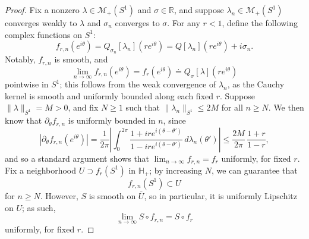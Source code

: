 \documentclass{cams-l} %
\newcommand{\dave}[1]{#1}\newcommand{\davebegin}{}\newcommand{\daveend}{}\newcommand{\george}[1]{#1}
\newcommand{\RR}{\mathbb R}
\newcommand{\HH}{\mathbb H}
\newcommand{\cM}{\mathcal M}
\newcommand{\ovl}[1]{{\overline{#1}}}
\theoremstyle{definition}
\theoremstyle{remark}
\numberwithin{equation}{section}
\begin{document}
\begin{proof}
    Fix a nonzero $\lambda\in\cM_+(S^1)$ and $\sigma\in\RR$, and suppose $\lambda_n\in\cM_+(S^1)$ converges weakly to $\lambda$ and $\sigma_n$ converges to $\sigma$. For any $r<1$, define the following complex functions on $S^1$:
    \[f_{r,n}(e^{i\theta}) = Q_{\sigma_n}[\lambda_n](re^{i\theta}) = Q[\lambda_n](re^{i\theta}) + i\sigma_n.\]
    Notably, $f_{r,n}$ is smooth, and 
    \[\lim_{n\to\infty} f_{r,n}(e^{i\theta}) = f_r(e^{i\theta})\doteq Q_\sigma[\lambda](re^{i\theta})\]
    pointwise in $S^1$; this follows from the weak convergence of $\lambda_n$, as the Cauchy kernel is smooth and uniformly bounded along each fixed $r$. Suppose $\|\lambda\|_{S^1} = M>0$, and fix $N\geq 1$ such that $\|\lambda_{n}\|_{S^1}\leq 2M$ for all $n\geq N$. We then know that $\partial_\theta f_{r,n}$ is uniformly bounded in $n$, since
    \[|\partial_\theta f_{r,n}(e^{i\theta})| = \frac{1}{2\pi}\left|\int_0^{2\pi}\frac{1+ire^{i(\theta-\theta')}}{1-ire^{i(\theta-\theta')}}\,d\lambda_n(\theta')\right| \leq \frac{2M}{2\pi}\,\frac{1+r}{1-r},\]
    \dave{and so a standard argument shows that $\lim_{n\to\infty} f_{r,n}=f_r$
    uniformly, for fixed $r$}. Fix a neighborhood $U\supset f_r(S^1)$ in $\HH_+$; by increasing $N$, we can guarantee that 
    \[f_{r,n}(S^1)\subset U\]
    for $n\geq N$. However, $S$ is smooth on $\ovl{U}$, so in particular, it is uniformly Lipschitz on $U$; as such,
    \[\lim_{n\to\infty} S\circ f_{r,n} = S\circ f_r\]
    uniformly, for fixed $r$.


\end{proof}
\end{document}
